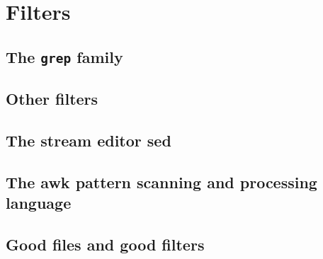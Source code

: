 \chapter{Filters}
\label{chap:filters}
\section{The \texttt{grep} family}
\section{Other filters}
\section{The stream editor \textbf{sed}}
\section{The \textbf{awk} pattern scanning and processing language}
\section{Good files and good filters}
